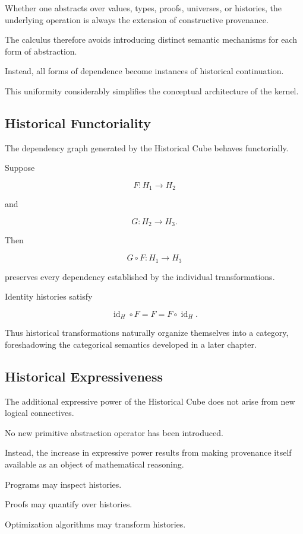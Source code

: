 \documentclass[12pt,oneside]{article}
\theoremstyle{definition}
\theoremstyle{remark}
\begin{document}
Whether one abstracts over values, types, proofs, universes, or histories, the
underlying operation is always the extension of constructive provenance.

The calculus therefore avoids introducing distinct semantic mechanisms for each
form of abstraction.

Instead, all forms of dependence become instances of historical continuation.

This uniformity considerably simplifies the conceptual architecture of the
kernel.

\subsection{Historical Functoriality}

The dependency graph generated by the Historical Cube behaves functorially.

Suppose

\[
F
:
H_1
\rightarrow
H_2
\]

and

\[
G
:
H_2
\rightarrow
H_3.
\]

Then

\[
G\circ F
:
H_1
\rightarrow
H_3
\]

preserves every dependency established by the individual transformations.

Identity histories satisfy

\[
\operatorname{id}_H
\circ
F
=
F
=
F
\circ
\operatorname{id}_H.
\]

Thus historical transformations naturally organize themselves into a category,
foreshadowing the categorical semantics developed in a later chapter.

\subsection{Historical Expressiveness}

The additional expressive power of the Historical Cube does not arise from new
logical connectives.

No new primitive abstraction operator has been introduced.

Instead, the increase in expressive power results from making provenance itself
available as an object of mathematical reasoning.

Programs may inspect histories.

Proofs may quantify over histories.

Optimization algorithms may transform histories.
\end{document}
